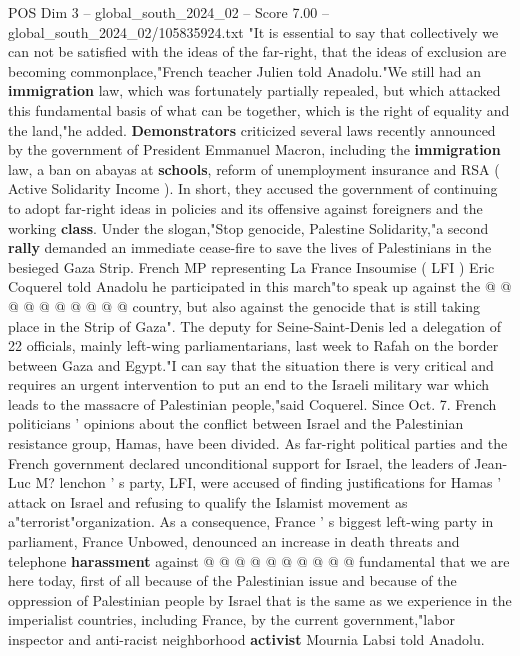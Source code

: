 \begin{textsample}{POS Dim 3 – global\_south\_2024\_02 – Score 7.00 – global\_south\_2024\_02/105835924.txt}  \label{ex:f3_pos_372}
"It is essential to say that collectively we can not be satisfied with the ideas of the far-right, that the ideas of exclusion are becoming commonplace,"French teacher Julien told Anadolu."We still had an \textbf{immigration} law, which was fortunately partially repealed, but which attacked this fundamental basis of what can be together, which is the right of equality and the land,"he added. \textbf{Demonstrators} criticized several laws recently announced by the government of President Emmanuel Macron, including the \textbf{immigration} law, a ban on abayas at \textbf{schools}, reform of unemployment insurance and RSA ( Active Solidarity Income ).
In short, they accused the government of continuing to adopt far-right ideas in policies and its offensive against foreigners and the working \textbf{class}.
Under the slogan,"Stop genocide, Palestine Solidarity,"a second \textbf{rally} demanded an immediate cease-fire to save the lives of Palestinians in the besieged Gaza Strip.
French MP representing La France Insoumise ( LFI ) Eric Coquerel told Anadolu he participated in this march"to speak up against the @ @ @ @ @ @ @ @ @ @ country, but also against the genocide that is still taking place in the Strip of Gaza".
The deputy for Seine-Saint-Denis led a delegation of 22 officials, mainly left-wing parliamentarians, last week to Rafah on the border between Gaza and Egypt."I can say that the situation there is very critical and requires an urgent intervention to put an end to the Israeli military war which leads to the massacre of Palestinian people,"said Coquerel.
Since Oct. 7.
French politicians ' opinions about the conflict between Israel and the Palestinian resistance group, Hamas, have been divided.
As far-right political parties and the French government declared unconditional support for Israel, the leaders of Jean-Luc M? lenchon ' s party, LFI, were accused of finding justifications for Hamas ' attack on Israel and refusing to qualify the Islamist movement as a"terrorist"organization.
As a consequence, France ' s biggest left-wing party in parliament, France Unbowed, denounced an increase in death threats and telephone \textbf{harassment} against @ @ @ @ @ @ @ @ @ @ fundamental that we are here today, first of all because of the Palestinian issue and because of the oppression of Palestinian people by Israel that is the same as we experience in the imperialist countries, including France, by the current government,"labor inspector and anti-racist neighborhood \textbf{activist} Mournia Labsi told Anadolu.

\end{textsample}
